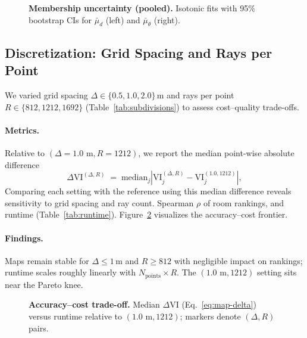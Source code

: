 \documentclass[final,3p,times,review]{elsarticle}
\begin{document}
\begin{figure}[H]
\centering
\caption{\textbf{Membership uncertainty (pooled).} Isotonic fits with 95\% bootstrap CIs for $\bar{\mu}_d$ (left) and $\bar{\mu}_\theta$ (right).}
\label{fig:mf-uncertainty}
\end{figure}

\subsection{Discretization: Grid Spacing and Rays per Point}
We varied grid spacing $\Delta\in\{0.5,1.0,2.0\}$\,m and rays per point $R\in\{812,1212,1692\}$ (Table~\ref{tab:subdivisions}) to assess cost--quality trade-offs.

\paragraph{Metrics.}
Relative to $(\Delta{=}1.0\text{ m}, R{=}1212)$, we report the median point-wise absolute difference
\begin{equation}
\Delta \mathrm{VI}^{(\Delta,R)} \;=\; \mathrm{median}_j \left| \mathrm{VI}_j^{(\Delta,R)} - \mathrm{VI}_j^{(1.0,1212)} \right|,
\label{eq:map-delta}
\end{equation}
Comparing each setting with the reference using this median difference reveals sensitivity to grid spacing and ray count.
Spearman $\rho$ of room rankings, and runtime (Table~\ref{tab:runtime}). Figure~\ref{fig:discretization-tradeoff} visualizes the accuracy--cost frontier.

\paragraph{Findings.}
Maps remain stable for $\Delta\le1$\,m and $R\ge812$ with negligible impact on rankings; runtime scales roughly linearly with $N_\text{points}\times R$. The $(1.0\text{ m}, 1212)$ setting sits near the Pareto knee.

\begin{figure}[H]
\centering
\caption{\textbf{Accuracy--cost trade-off.} Median $\Delta \mathrm{VI}$ (Eq.~\ref{eq:map-delta}) versus runtime relative to $(1.0\text{ m},1212)$; markers denote $(\Delta,R)$ pairs.}
\label{fig:discretization-tradeoff}
\end{figure}
\end{document}
